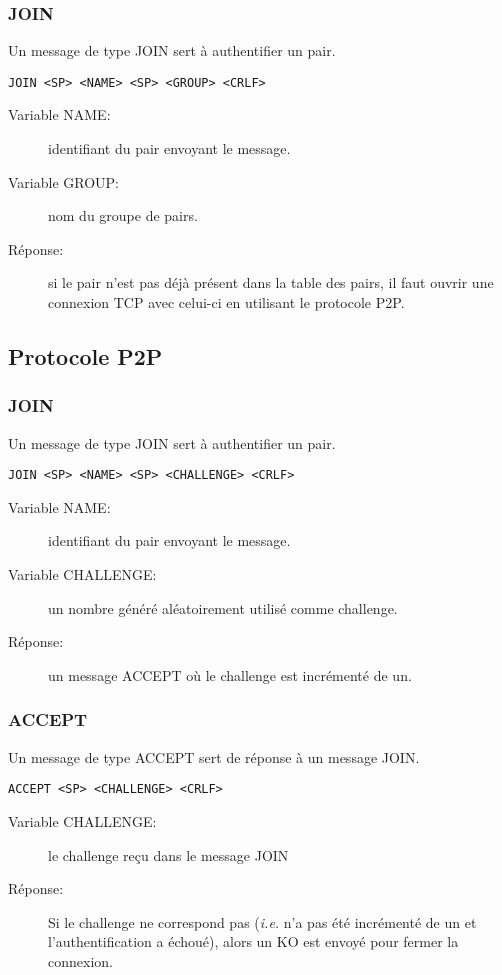 \subsubsection*{JOIN}
Un message de type JOIN sert à authentifier un pair.
\begin{verbatim}
JOIN <SP> <NAME> <SP> <GROUP> <CRLF>
\end{verbatim}
\begin{description}
\item[Variable NAME:] identifiant du pair envoyant le message.
\item[Variable GROUP:] nom du groupe de pairs.
\item[Réponse:] si le pair n'est pas déjà présent dans la table des pairs,
  il faut ouvrir une connexion TCP avec celui-ci en utilisant le protocole P2P.
\end{description}

\subsection{Protocole P2P}
\subsubsection*{JOIN}
Un message de type JOIN sert à authentifier un pair.
\begin{verbatim}
JOIN <SP> <NAME> <SP> <CHALLENGE> <CRLF>
\end{verbatim}
\begin{description}
\item[Variable NAME:] identifiant du pair envoyant le message.
\item[Variable CHALLENGE:] un nombre généré aléatoirement utilisé comme
  challenge.
\item[Réponse:] un message ACCEPT où le challenge est incrémenté de un.
\end{description}

\hrulefill

\subsubsection*{ACCEPT}
Un message de type ACCEPT sert de réponse à un message JOIN.
\begin{verbatim}
ACCEPT <SP> <CHALLENGE> <CRLF>
\end{verbatim}
\begin{description}
\item[Variable CHALLENGE:] le challenge reçu dans le message JOIN
\item[Réponse:] Si le challenge ne correspond pas (\emph{i.e.} n'a pas été
  incrémenté de un et l'authentification a échoué), alors un KO est envoyé
  pour fermer la connexion.
\end{description}

